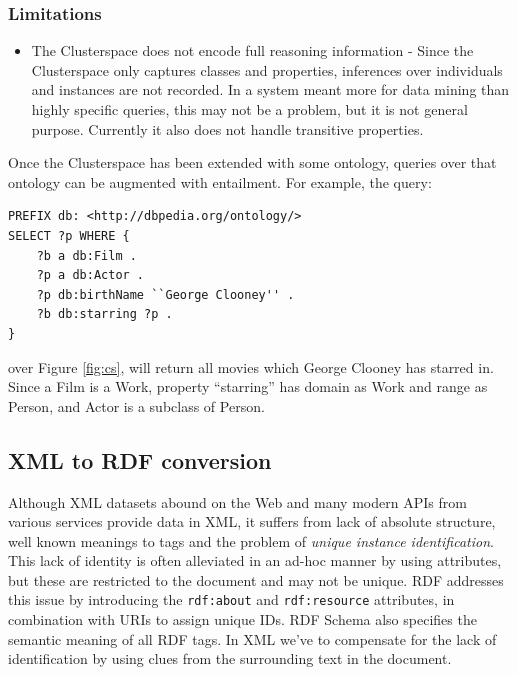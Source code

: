 \documentclass[journal]{IEEEtran}
\begin{document}
\subsubsection*{Limitations}
\begin{itemize}
    \item The Clusterspace does not encode full reasoning information - Since
        the Clusterspace only captures classes and properties, inferences over
        individuals and instances are not recorded. In a system meant more for
        data mining than highly specific queries, this may not be a problem,
        but it is not general purpose. Currently it also does not handle
        transitive properties.
\end{itemize}

Once the Clusterspace has been extended with some ontology, queries over that
ontology can be augmented with entailment. For example, the query:

\begin{verbatim}
PREFIX db: <http://dbpedia.org/ontology/>
SELECT ?p WHERE {
    ?b a db:Film .
    ?p a db:Actor .
    ?p db:birthName ``George Clooney'' .
    ?b db:starring ?p .
}
\end{verbatim}

over Figure \ref{fig:cs}, will return all movies which George Clooney has starred in.
Since a Film is a Work, property ``starring'' has domain as Work
and range as Person, and Actor is a subclass of Person.

\subsection{XML to RDF conversion}

Although XML datasets abound on the Web and many modern APIs from various
services provide data in XML, it suffers from lack of absolute structure, well
known meanings to tags and the problem of \emph{unique instance
identification}. This lack of identity is often alleviated in an ad-hoc manner
by using attributes, but these are restricted to the document and may not be
unique. RDF addresses this issue by introducing the \texttt{rdf:about} and
\texttt{rdf:resource} attributes, in combination with URIs to assign unique
IDs. RDF Schema also specifies the semantic meaning of all RDF tags. In XML
we've to compensate for the lack of identification by using clues from the
surrounding text in the document.
\end{document}
